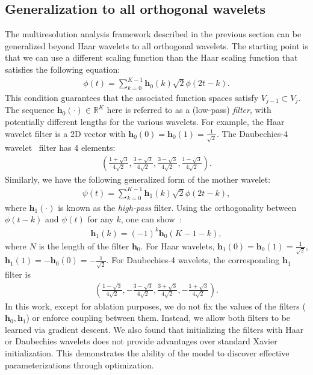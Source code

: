 \documentclass{article}
\theoremstyle{plain}
\theoremstyle{definition}
\theoremstyle{remark}
\begin{document}
\subsection{Generalization to all orthogonal wavelets}
\label{app:orth-wavelets}

The multiresolution analysis framework described in the previous section can be generalized beyond Haar wavelets
to all orthogonal wavelets. 
The starting point is that we can use a different scaling function than the Haar scaling function that satisfies the following equation:
\begin{align} \label{eq:orth-wavelet-father}
    \phi(t) = \sum_{k=0}^{K-1}\mathbf h_0(k)\sqrt{2}\phi(2t - k).
\end{align}
This condition guarantees that the associated function spaces satisfy $V_{j-1} \subset V_j$. 
The sequence $\mathbf h_0(\cdot) \in \mathbb{R}^K$ here is referred to as a (low-pass) \emph{filter}, with potentially different lengths for the various wavelets.
For example, the Haar wavelet filter is a 2D vector with $\mathbf h_0(0) = \mathbf h_0(1) = \frac{1}{\sqrt{2}}$. 
The Daubechies-4 wavelet~\citep{daubechies1988orthonormal} filter has 4 elements:
\begin{align*}
\left(\frac{1 + \sqrt{3}}{4\sqrt{2}}, \frac{3 + \sqrt{3}}{4\sqrt{2}}, \frac{3 - \sqrt{3}}{4\sqrt{2}}, \frac{1 - \sqrt{3}}{4\sqrt{2}}\right). 
\end{align*}
Similarly, we have the following generalized form of
the mother wavelet:
\begin{align} \label{eq:orth-wavelet-mother}
    \psi(t) = \sum_{k=0}^{K-1}\mathbf h_1(k)\sqrt{2}\phi(2t - k),
\end{align}
where $\mathbf h_1(\cdot)$ is known as the \emph{high-pass} filter.
Using the orthogonality between $\phi(t-k)$ and $\psi(t)$ for any $k$, one can show~\citep[see, e.g.,][]{strang1996wavelets}: 
\begin{align*}
    \mathbf h_1(k) = (-1)^k \mathbf h_0(K - 1-k),
\end{align*}
where $N$ is the length of the filter $\mathbf h_0$. For Haar wavelets, $\mathbf h_1(0) = \mathbf h_0(1) = \frac{1}{\sqrt{2}}$, $\mathbf h_1(1) = -\mathbf h_0(0) = -\frac{1}{\sqrt{2}}$. 
For Daubechies-4 wavelets, the corresponding $\mathbf h_1$ filter is
\begin{align*}
    \left(\frac{1 - \sqrt{3}}{4\sqrt{2}}, -\frac{3 - \sqrt{3}}{4\sqrt{2}}, \frac{3 + \sqrt{3}}{4\sqrt{2}}, -\frac{1 + \sqrt{3}}{4\sqrt{2}}\right). 
\end{align*}
In this work, except for ablation purposes, we do not fix the values of the filters ($\mathbf h_0, \mathbf h_1$) or enforce coupling between them.
Instead, we allow both filters to be learned via gradient descent. 
We also found that initializing the filters with Haar or Daubechies wavelets does not provide advantages over standard Xavier initialization.
This demonstrates the ability of the model to discover effective parameterizations through optimization.
\end{document}
